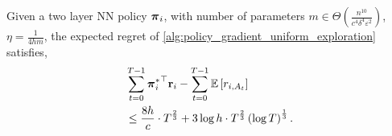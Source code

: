 \begin{thm}
\label{thm:main_result}
    Given a two layer NN policy ${\boldsymbol{\pi}}_i$, with number of parameters $m \in \Theta\left( \frac{n^{10}}{c^4 \delta^4 \varepsilon^2} \right)$, $\eta = \frac{1}{4 h m}$, the expected regret of \cref{alg:policy_gradient_uniform_exploration} satisfies,
\begin{equation*}
\begin{split}
    &\sum\limits_{t=0}^{T-1}{ {{\boldsymbol{\pi}}_i^*}^\top {\mathbf{r}}_i } - \sum\limits_{t=0}^{T-1}{ {\mathbb{E}} \left[ r_{i, A_t} \right] } \\
    &\le \frac{8 h}{c} \cdot T^{\frac{2}{3}} + 3 \log{h} \cdot T^{\frac{2}{3}} \left(\log{T}\right)^{\frac{1}{3}}.
\end{split}
\end{equation*}
\end{thm}
